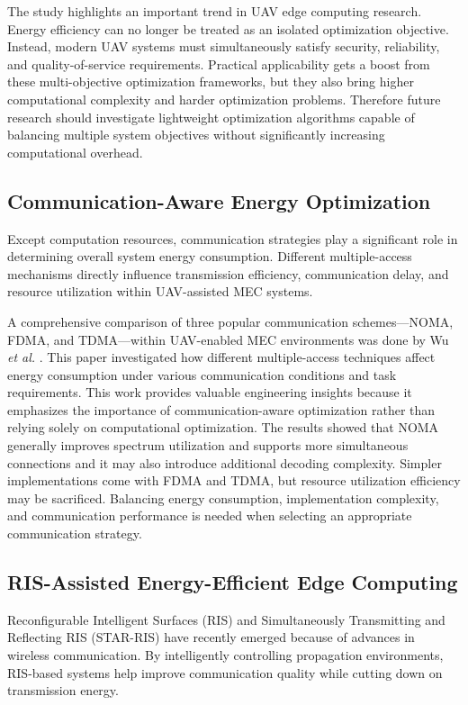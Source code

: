\documentclass[a4paper, 12pt]{article}
\begin{document}
The study highlights an important trend in UAV edge computing research. Energy efficiency can no longer be treated as an isolated optimization objective. Instead, modern UAV systems must simultaneously satisfy security, reliability, and quality-of-service requirements. Practical applicability gets a boost from these multi-objective optimization frameworks, but they also bring higher computational complexity and harder optimization problems. Therefore future research should investigate lightweight optimization algorithms capable of balancing multiple system objectives without significantly increasing computational overhead.

\subsection*{Communication-Aware Energy Optimization}
Except computation resources, communication strategies play a significant role in determining overall system energy consumption. Different multiple-access mechanisms directly influence transmission efficiency, communication delay, and resource utilization within UAV-assisted MEC systems.

A comprehensive comparison of three popular communication schemes—NOMA, FDMA, and TDMA—within UAV-enabled MEC environments was done by Wu \textit{et al.} \cite{Wu2026NOMA}. This paper investigated how different multiple-access techniques affect energy consumption under various communication conditions and task requirements. This work provides valuable engineering insights because it emphasizes the importance of communication-aware optimization rather than relying solely on computational optimization. 
The results showed that NOMA generally improves spectrum utilization and supports more simultaneous connections and it may also introduce additional decoding complexity. Simpler implementations come with FDMA and TDMA, but resource utilization efficiency may be sacrificed. Balancing energy consumption, implementation complexity, and communication performance is needed when selecting an appropriate communication strategy.

\subsection*{RIS-Assisted Energy-Efficient Edge Computing}
Reconfigurable Intelligent Surfaces (RIS) and Simultaneously Transmitting and Reflecting RIS (STAR-RIS) have recently emerged because of advances in wireless communication. By intelligently controlling propagation environments, RIS-based systems help improve communication quality while cutting down on transmission energy.
\end{document}
